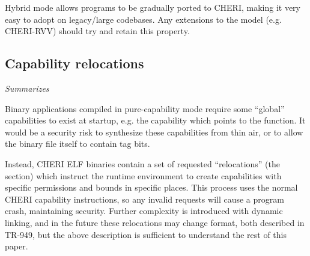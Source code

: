 Hybrid mode allows programs to be gradually ported to CHERI, making it very easy to adopt on legacy/large codebases.
Any extensions to the model (e.g. CHERI-RVV) should try and retain this property.

\subsection{Capability relocations\label{chap:bg:subsec:cherirelocs}}
\emph{Summarizes~\cite[Section 4.4, Appendix C]{TR-949}}

Binary applications compiled in pure-capability mode require some ``global'' capabilities to exist at startup, e.g. the capability which points to the  function.
It would be a security risk to synthesize these capabilities from thin air, or to allow the binary file itself to contain tag bits.

Instead, CHERI ELF binaries contain a set of requested ``relocations'' (the  section) which instruct the runtime environment to create capabilities with specific permissions and bounds in specific places.
This process uses the normal CHERI capability instructions, so any invalid requests will cause a program crash, maintaining security.
Further complexity is introduced with dynamic linking, and in the future these relocations may change format, both described in TR-949\cite{TR-949}, but the above description is sufficient to understand the rest of this paper.


